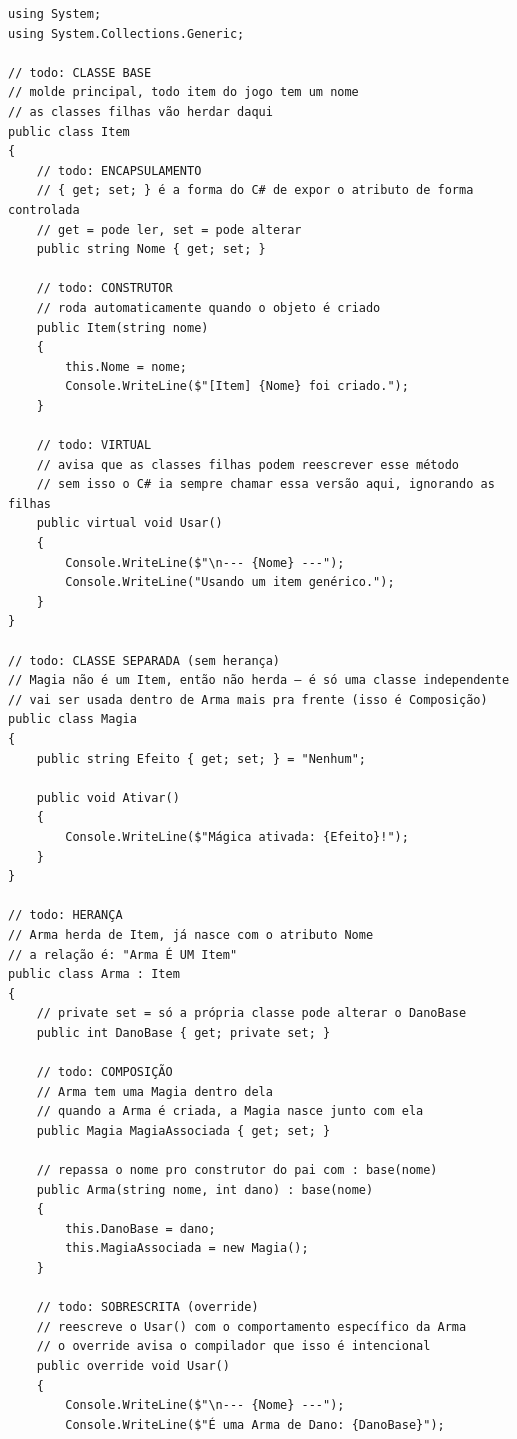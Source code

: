 \begin{lstlisting}[style=csharp, caption={Exemplo de Aplicação de POO em C\#}]
using System;
using System.Collections.Generic;

// todo: CLASSE BASE
// molde principal, todo item do jogo tem um nome
// as classes filhas vão herdar daqui
public class Item
{
    // todo: ENCAPSULAMENTO
    // { get; set; } é a forma do C# de expor o atributo de forma controlada
    // get = pode ler, set = pode alterar
    public string Nome { get; set; }

    // todo: CONSTRUTOR
    // roda automaticamente quando o objeto é criado
    public Item(string nome)
    {
        this.Nome = nome;
        Console.WriteLine($"[Item] {Nome} foi criado.");
    }

    // todo: VIRTUAL
    // avisa que as classes filhas podem reescrever esse método
    // sem isso o C# ia sempre chamar essa versão aqui, ignorando as filhas
    public virtual void Usar()
    {
        Console.WriteLine($"\n--- {Nome} ---");
        Console.WriteLine("Usando um item genérico.");
    }
}

// todo: CLASSE SEPARADA (sem herança)
// Magia não é um Item, então não herda — é só uma classe independente
// vai ser usada dentro de Arma mais pra frente (isso é Composição)
public class Magia
{
    public string Efeito { get; set; } = "Nenhum";

    public void Ativar()
    {
        Console.WriteLine($"Mágica ativada: {Efeito}!");
    }
}

// todo: HERANÇA
// Arma herda de Item, já nasce com o atributo Nome
// a relação é: "Arma É UM Item"
public class Arma : Item
{
    // private set = só a própria classe pode alterar o DanoBase
    public int DanoBase { get; private set; }

    // todo: COMPOSIÇÃO
    // Arma tem uma Magia dentro dela
    // quando a Arma é criada, a Magia nasce junto com ela
    public Magia MagiaAssociada { get; set; }

    // repassa o nome pro construtor do pai com : base(nome)
    public Arma(string nome, int dano) : base(nome)
    {
        this.DanoBase = dano;
        this.MagiaAssociada = new Magia();
    }

    // todo: SOBRESCRITA (override)
    // reescreve o Usar() com o comportamento específico da Arma
    // o override avisa o compilador que isso é intencional
    public override void Usar()
    {
        Console.WriteLine($"\n--- {Nome} ---");
        Console.WriteLine($"É uma Arma de Dano: {DanoBase}");


\end{lstlisting}
